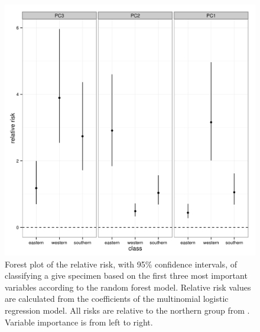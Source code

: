 \documentclass[12pt,letterpaper]{article}\usepackage{graphicx, color}
\begin{document}
\begin{figure}[ht]
  \centering
  \includegraphics[width = \textwidth]{figure/rel_risk}
  \caption{Forest plot of the relative risk, with 95\% confidence intervals, of classifying a give specimen based on the first three most important variables according to the random forest model. Relative risk values are calculated from the coefficients of the multinomial logistic regression model. All risks are relative to the northern group from \citet{Spinks2005,Spinks2010}. Variable importance is from left to right.}
  \label{fig:rel_risk}
\end{figure}
\end{document}
